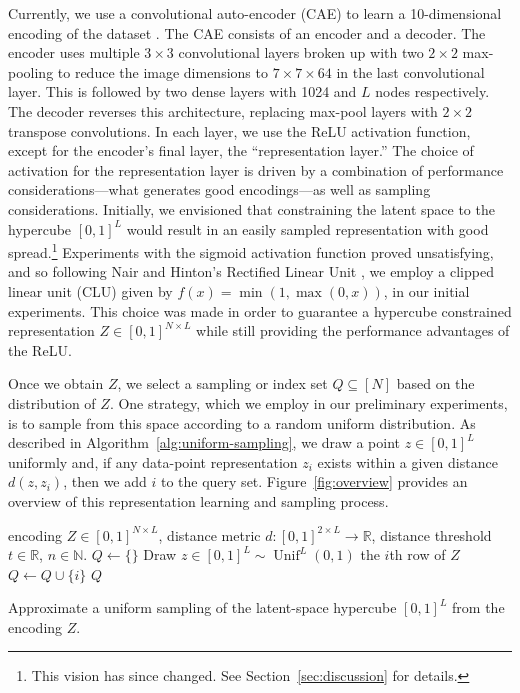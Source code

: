 \documentclass[a4paper]{article}
\DeclareMathOperator{\unif}{Unif}
\begin{document}
Currently, we use a convolutional auto-encoder (CAE) to learn a 10-dimensional
encoding of the dataset \cite{krizhevsky_imagenet_2012,
  goodfellow_deep_nodate}. The CAE consists of an encoder and a decoder. The
encoder uses multiple $3\times 3$ convolutional layers broken up with two
$2\times 2$ max-pooling to reduce the image dimensions to $7\times 7 \times 64$
in the last convolutional layer. This is followed by two dense layers with 1024
and $L$ nodes respectively. The decoder reverses this architecture, replacing
max-pool layers with $2\times 2$ transpose convolutions. In each layer, we use
the ReLU activation function, except for the encoder's final layer, the
``representation layer.'' The choice of activation for the representation layer
is driven by a combination of performance considerations---what generates good
encodings---as well as sampling considerations. Initially, we envisioned that
constraining the latent space to the hypercube $[0,1]^L$ would result in an
easily sampled representation with good spread.\footnote{This vision has since
  changed. See Section~\ref{sec:discussion} for details.} Experiments with the
sigmoid activation function proved unsatisfying, and so following Nair and
Hinton's Rectified Linear Unit \cite{nair_rectified_nodate}, we employ a clipped
linear unit (CLU) given by $f(x) = \min(1, \max(0,x))$, in our initial
experiments. This choice was made in order to guarantee a hypercube constrained
representation $Z \in [0,1]^{N\times L}$ while still providing the performance
advantages of the ReLU.

Once we obtain $Z$, we select a sampling or index set $Q \subseteq [N]$ based on
the distribution of $Z$. One strategy, which we employ in our preliminary
experiments, is to sample from this space according to a random uniform
distribution. As described in Algorithm~\ref{alg:uniform-sampling}, we draw a
point $z \in [0,1]^L$ uniformly and, if any data-point representation $z_i$
exists within a given distance $d(z,z_i)$, then we add $i$ to the query
set. Figure~\ref{fig:overview} provides an overview of this representation
learning and sampling process.

\begin{algorithm}
  \begin{algorithmic}[1]
    \Require encoding $Z \in [0,1]^{N \times L}$, distance metric
    $d : [0,1]^{2 \times L} \rightarrow \mathbb{R}$, distance threshold
    $t \in \mathbb{R}$, $n \in \mathbb{N}$.
    \State $Q \gets \{\}$
    \State Draw $z \in [0,1]^L \sim \unif^L(0,1)$
    \Comment the $i$th row of $Z$
    \State $Q \gets Q \cup \{i\}$
    \EndIf
    \EndFor
    \EndWhile
    \State \Return $Q$
  \end{algorithmic}
  \caption{Approximate a uniform sampling of the latent-space hypercube
    $[0,1]^L$ from the encoding $Z$.}
  \label{alg:uniform-sampling}
\end{algorithm}
\end{document}
